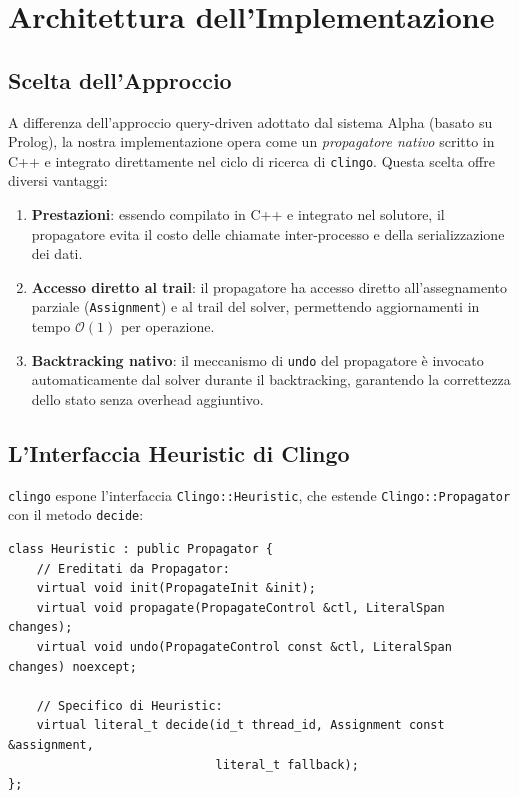 \documentclass[a4paper,12pt,twoside,openright]{report}
\newcommand{\clingo}{\texttt{clingo}}
\begin{document}
\chapter{Architettura dell'Implementazione}
\label{ch:architettura}

\section{Scelta dell'Approccio}

A differenza dell'approccio query-driven adottato dal sistema Alpha (basato su Prolog), la nostra implementazione opera come un \emph{propagatore nativo} scritto in C++ e integrato direttamente nel ciclo di ricerca di \clingo{}. Questa scelta offre diversi vantaggi:

\begin{enumerate}
    \item \textbf{Prestazioni}: essendo compilato in C++ e integrato nel solutore, il propagatore evita il costo delle chiamate inter-processo e della serializzazione dei dati.
    \item \textbf{Accesso diretto al trail}: il propagatore ha accesso diretto all'assegnamento parziale (\texttt{Assignment}) e al trail del solver, permettendo aggiornamenti in tempo $\mathcal{O}(1)$ per operazione.
    \item \textbf{Backtracking nativo}: il meccanismo di \texttt{undo} del propagatore \`{e} invocato automaticamente dal solver durante il backtracking, garantendo la correttezza dello stato senza overhead aggiuntivo.
\end{enumerate}

\section{L'Interfaccia Heuristic di Clingo}
\label{sec:interfaccia_heuristic}

\clingo{} espone l'interfaccia \texttt{Clingo::Heuristic}, che estende \texttt{Clingo::Propagator} con il metodo \texttt{decide}:

\begin{lstlisting}[style=cppstyle,caption={Interfaccia \texttt{Heuristic} di Clingo}]
class Heuristic : public Propagator {
    // Ereditati da Propagator:
    virtual void init(PropagateInit &init);
    virtual void propagate(PropagateControl &ctl, LiteralSpan changes);
    virtual void undo(PropagateControl const &ctl, LiteralSpan changes) noexcept;

    // Specifico di Heuristic:
    virtual literal_t decide(id_t thread_id, Assignment const &assignment,
                             literal_t fallback);
};
\end{lstlisting}
\end{document}
